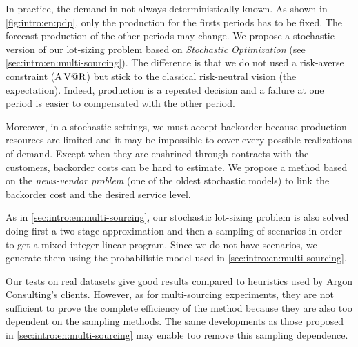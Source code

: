 \medskip


In practice, the demand in not always deterministically known.
As shown in \cref{fig:intro:en:pdp}, only the production for the firsts periods has to be fixed.
The forecast production of the other periods may change.
We propose a stochastic version of our lot-sizing problem based on \emph{Stochastic Optimization} (see \cref{sec:intro:en:multi-sourcing}).
The difference is that we do not used a risk-averse constraint ($\operatorname{A\operatorname{V@R}}$) but stick to the classical risk-neutral vision (the expectation).
Indeed, production is a repeated decision and a failure at one period is easier to compensated with the other period.


Moreover, in a stochastic settings, we must accept backorder because production resources are limited and it may be impossible to cover every possible realizations of demand.
Except when they are enshrined through contracts with the customers, backorder costs can be hard to estimate.
We propose a method based on the \emph{news-vendor problem} (one of the oldest stochastic models) to link the backorder cost and the desired service level.


As in \cref{sec:intro:en:multi-sourcing}, our stochastic lot-sizing problem is also solved doing first a two-stage approximation and then a sampling of scenarios in order to get a mixed integer linear program.
Since we do not have scenarios, we generate them using the probabilistic model used in \cref{sec:intro:en:multi-sourcing}.


\medskip


Our tests on real datasets give good results compared to heuristics used by Argon Consulting's clients.
However, as for multi-sourcing experiments, they are not sufficient to prove the complete efficiency of the method because they are also too dependent on the sampling methods.
The same developments as those proposed in \cref{sec:intro:en:multi-sourcing} may enable too remove this sampling dependence.

